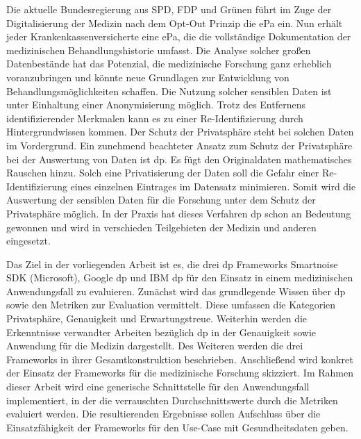 
Die aktuelle Bundesregierung aus SPD, FDP und Grünen führt im Zuge der Digitalisierung der Medizin nach dem Opt-Out Prinzip die \gls{ePa} ein. Nun erhält jeder Krankenkassenversicherte eine \gls{ePa}, die die vollständige Dokumentation der medizinischen Behandlungshistorie umfasst. Die Analyse solcher großen Datenbestände hat das Potenzial, die medizinische Forschung ganz erheblich voranzubringen und könnte neue Grundlagen zur Entwicklung von Behandlungsmöglichkeiten schaffen. Die Nutzung solcher sensiblen Daten ist unter Einhaltung einer Anonymisierung möglich. Trotz des Entfernens identifizierender Merkmalen kann es zu einer Re-Identifizierung durch Hintergrundwissen kommen. Der Schutz der Privatsphäre steht bei solchen Daten im Vordergrund.  
Ein zunehmend beachteter Ansatz zum Schutz der Privatsphäre bei der Auswertung von Daten ist \gls{dp}. Es fügt den Originaldaten mathematisches Rauschen hinzu. Solch eine Privatisierung der Daten soll die Gefahr einer Re-Identifizierung eines einzelnen Eintrages im Datensatz minimieren. Somit wird die Auswertung der sensiblen Daten für die Forschung unter dem Schutz der Privatsphäre möglich. In der Praxis hat dieses Verfahren \gls{dp} schon an Bedeutung gewonnen und wird in verschieden Teilgebieten der Medizin und anderen eingesetzt.

Das Ziel in der vorliegenden Arbeit ist es, die drei \gls{dp} Frameworks Smartnoise SDK (Microsoft), Google \gls{dp} und IBM \gls{dp} für den Einsatz in einem medizinischen Anwendungsfall zu evaluieren. Zunächst wird das grundlegende Wissen über \gls{dp} sowie den Metriken zur Evaluation vermittelt. Diese umfassen die Kategorien Privatsphäre, Genauigkeit und Erwartungstreue. Weiterhin werden die Erkenntnisse verwandter Arbeiten bezüglich \gls{dp} in der Genauigkeit sowie Anwendung für die Medizin dargestellt. Des Weiteren werden die drei Frameworks in ihrer Gesamtkonstruktion beschrieben. Anschließend wird konkret der Einsatz der Frameworks für die medizinische Forschung skizziert. 
Im Rahmen dieser Arbeit wird eine generische Schnittstelle für den Anwendungsfall implementiert, in der die verrauschten Durchschnittswerte durch die Metriken evaluiert werden. Die resultierenden Ergebnisse sollen Aufschluss über die Einsatzfähigkeit der Frameworks für den Use-Case mit Gesundheitsdaten geben.